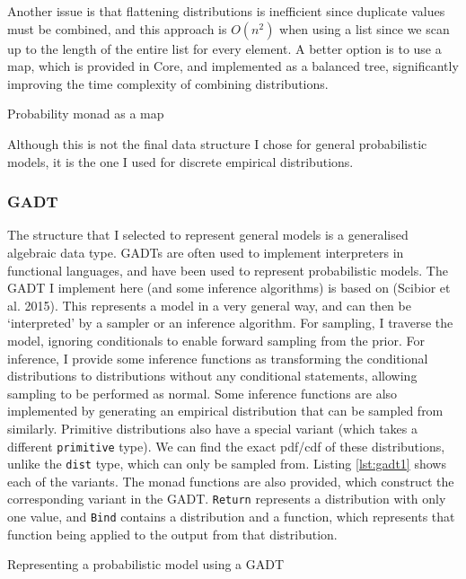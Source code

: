 Another issue is that flattening distributions is inefficient since duplicate values must be combined, and this approach is $O(n^2)$ when using a list since we scan up to the length of the entire list for every element. A better option is to use a map, which is provided in Core, and implemented as a balanced tree, significantly improving the time complexity of combining distributions.

\begin{listing}[!ht]
	\caption{Probability monad as a map}
	\label{lst:monad_pmap}
\end{listing}

Although this is not the final data structure I chose for general probabilistic models, it is the one I used for discrete empirical distributions.

\subsubsection{GADT} \label{sec:gadt}
The structure that I selected to represent general models is a generalised algebraic data type. GADTs are often used to implement interpreters in functional languages, and have been used to represent probabilistic models. The GADT I implement here (and some inference algorithms) is based on (Scibior et al. 2015)\cite{scibior2015practical}. This represents a model in a very general way, and can then be `interpreted' by a sampler or an inference algorithm. For sampling, I traverse the model, ignoring conditionals to enable forward sampling from the prior. For inference, I provide some inference functions as transforming the conditional distributions to distributions without any conditional statements, allowing sampling to be performed as normal. Some inference functions are also implemented by generating an empirical distribution that can be sampled from similarly. Primitive distributions also have a special variant (which takes a different \texttt{primitive} type). We can find the exact pdf/cdf of these distributions, unlike the \texttt{dist} type, which can only be sampled from. Listing \ref{lst:gadt1} shows each of the variants. The monad functions are also provided, which construct the corresponding variant in the GADT. \texttt{Return} represents a distribution with only one value, and \texttt{Bind} contains a distribution and a function, which represents that function being applied to the output from that distribution.

\begin{listing}[!ht]
	\caption{Representing a probabilistic model using a GADT}
	\label{lst:gadt1}
\end{listing}

